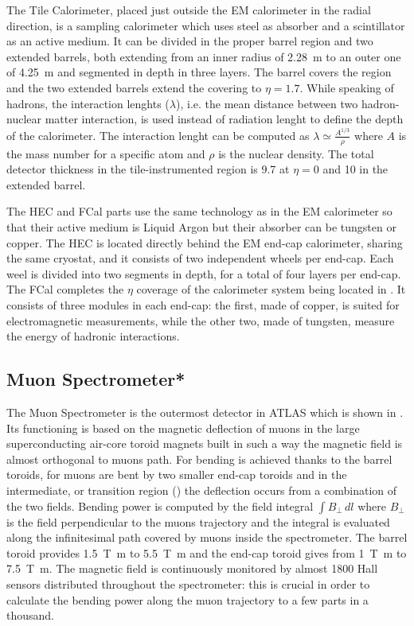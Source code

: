 The Tile Calorimeter, placed just outside the EM calorimeter in the radial direction, is a sampling calorimeter which uses steel as absorber and a scintillator as an active medium. It can be divided in the proper barrel region and two extended barrels, both extending from an inner radius of \SI{2.28}{\m} to an outer one of \SI{4.25}{\m} and segmented in depth in three layers. The barrel covers the region  and the two extended barrels extend the covering to $\eta=1.7$. While speaking of hadrons, the interaction lenghts ($\lambda$), i.e. the mean distance between two hadron-nuclear matter interaction, is used instead of radiation lenght to define the depth of the calorimeter. The interaction lenght can be computed as $\lambda \simeq \frac{A^{1/3}}{\rho}$ where $A$ is the mass number for a specific atom and $\rho$ is the nuclear density. The total detector thickness in the tile-instrumented region is \SI{9.7}{\lambda} at $\eta = 0$ and \SI{10}{\lambda} in the extended barrel.

The HEC and FCal parts use the same technology as in the EM calorimeter so that their active medium is Liquid Argon but their absorber can be tungsten or copper. The HEC is located directly behind the EM end-cap calorimeter, sharing the same cryostat, and it consists of two independent wheels per end-cap. Each weel is divided into two segments in depth, for a total of four layers per end-cap. The FCal completes the $\eta$ coverage of the calorimeter system being located in . It consists of three modules in each end-cap: the first, made of copper, is suited for electromagnetic measurements, while the other two, made of tungsten, measure the energy of hadronic interactions.

\subsection{Muon Spectrometer*}
\label{sec:muons}
The Muon Spectrometer is the outermost detector in ATLAS which is shown in \Fig{\ref{fig:muons}}. Its functioning is based on the magnetic deflection of muons in the large superconducting air-core toroid magnets built in such a way the magnetic field is almost orthogonal to muons path. For  bending is achieved thanks to the barrel toroids, for  muons are bent by two smaller end-cap toroids and in the intermediate, or transition region () the deflection occurs from a combination of the two fields. Bending power is computed by the field integral $\int B_{\bot}\,dl$ where $B_{\bot}$ is the field perpendicular to the muons trajectory and the integral is evaluated along the infinitesimal path covered by muons inside the spectrometer. The barrel toroid provides \SI{1.5}{\tesla \metre} to \SI{5.5}{\tesla \metre} and the end-cap toroid gives from \SI{1}{\tesla \metre} to \SI{7.5}{\tesla \metre}. The magnetic field is continuously monitored by almost 1800 Hall sensors distributed throughout the spectrometer: this is crucial in order to calculate the bending power along the muon trajectory to a few parts in a thousand.

